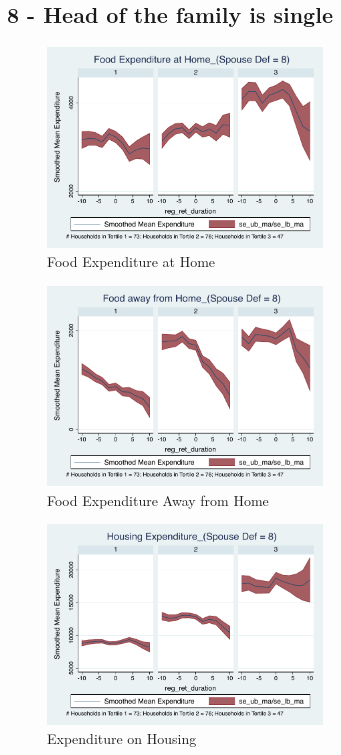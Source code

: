 \documentclass[11pt,onecolumn]{article}
\numberwithin{figure}{section}
\begin{document}
\clearpage


\subsection{8 - Head of the family is single}

\begin{figure}[h]
	\caption{Food Expenditure at Home}
	\centering
	\includegraphics[width=0.65\textwidth]{../ConsumptionPostRetirement_by_SpouseDef_Cats/Smoothed/8/spouse_def_total_foodexp_home_real.pdf}
\end{figure}


\begin{figure}[h]
	\caption{Food Expenditure Away from Home}
	\centering
	\includegraphics[width=0.65\textwidth]{../ConsumptionPostRetirement_by_SpouseDef_Cats/Smoothed/8/spouse_def_total_foodexp_away_real.pdf}
\end{figure}

\clearpage

\begin{figure}[h]
	\caption{Expenditure on Housing}
	\centering
	\includegraphics[width=0.65\textwidth]{../ConsumptionPostRetirement_by_SpouseDef_Cats/Smoothed/8/spouse_def_total_housing_real.pdf}
\end{figure}
\end{document}
